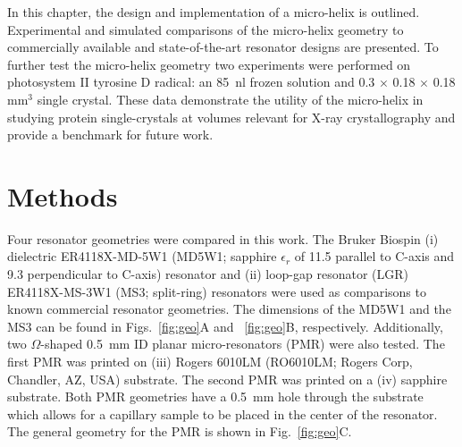 In this chapter, the design and implementation of a micro-helix is outlined. Experimental and simulated comparisons of the micro-helix geometry to commercially available and state-of-the-art resonator designs are presented. To further test the micro-helix geometry two experiments were performed on photosystem II tyrosine D radical: an 85~nl frozen solution and 0.3 $\times$ 0.18 $\times$ 0.18 mm$^3$ single crystal. These data demonstrate the utility of the micro-helix in studying protein single-crystals at volumes relevant for X-ray crystallography and provide a benchmark for future work.


\section{Methods}
Four resonator geometries were compared in this work. The Bruker Biospin (i) dielectric ER4118X-MD-5W1 (MD5W1; sapphire $\epsilon_r$ of 11.5 parallel to C-axis and 9.3 perpendicular to C-axis) resonator and (ii) loop-gap resonator (LGR) ER4118X-MS-3W1 (MS3; split-ring) resonators were used as comparisons to known commercial resonator geometries. The dimensions of the MD5W1 and the MS3 can be found in Figs.~\ref{fig:geo}A and ~\ref{fig:geo}B, respectively. Additionally, two $\Omega$-shaped 0.5~mm ID planar micro-resonators (PMR) were also tested. \cite{Suter2005, Suter2008, NARKOWICZ201379, suter2015} The first PMR was printed on (iii) Rogers 6010LM (RO6010LM; Rogers Corp, Chandler, AZ, USA) substrate. The second PMR was printed on a (iv) sapphire substrate. Both PMR geometries have a 0.5~mm hole through the substrate which allows for a capillary sample to be placed in the center of the resonator. The general geometry for the PMR is shown in Fig.~\ref{fig:geo}C.

